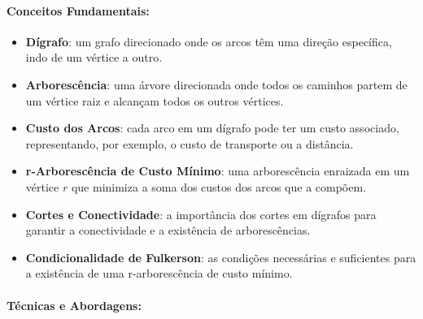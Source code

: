 \documentclass[12pt,a4paper]{article}
\begin{document}
\paragraph{Conceitos Fundamentais:}
\begin{itemize}\setlength{\itemsep}{2pt}
    \item \textbf{Dígrafo}: um grafo direcionado onde os arcos têm uma direção específica, indo de um vértice a outro.
    \item \textbf{Arborescência}: uma árvore direcionada onde todos os caminhos partem de um vértice raiz e alcançam todos os outros vértices.
    \item \textbf{Custo dos Arcos}: cada arco em um dígrafo pode ter um custo associado, representando, por exemplo, o custo de transporte ou a distância.
    \item \textbf{r-Arborescência de Custo Mínimo}: uma arborescência enraizada em um vértice \(r\) que minimiza a soma dos custos dos arcos que a compõem.
    \item \textbf{Cortes e Conectividade}: a importância dos cortes em dígrafos para garantir a conectividade e a existência de arborescências.
    \item \textbf{Condicionalidade de Fulkerson}: as condições necessárias e suficientes para a existência de uma r-arborescência de custo mínimo.
\end{itemize}

\paragraph{Técnicas e Abordagens:}
\end{document}

